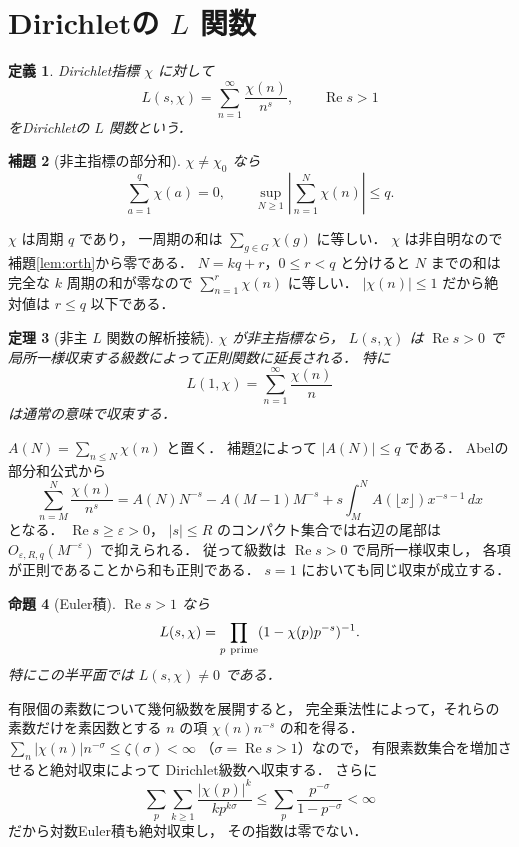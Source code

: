 \documentclass[a5paper,10pt,onecolumn]{jsarticle}
\makeatletter
\theoremstyle{mathnotetheorem}
\newtheorem{theorem}{定理}[section]
\newtheorem{definition}[theorem]{定義}
\newtheorem{lemma}[theorem]{補題}
\newtheorem{proposition}[theorem]{命題}
\renewcommand{\proofname}{証明}
\renewenvironment{proof}[1][\proofname]{%
  \par\pushQED{\qed}\normalfont\topsep4\p@\@plus2\p@\relax
  \trivlist\item[\hskip\labelsep\bfseries #1]\ignorespaces
}{\popQED\endtrivlist\@endpefalse}
\makeatother
\begin{document}
\section{Dirichletの $L$ 関数}

\begin{definition}
Dirichlet指標 $\chi$ に対して
\[
 L(s,\chi)=\sum_{n=1}^\infty\frac{\chi(n)}{n^s},
 \qquad \operatorname{Re}s>1
\]
をDirichletの $L$ 関数という．
\end{definition}

\begin{lemma}[非主指標の部分和]\label{lem:partialsums}
$\chi\ne\chi_0$ なら
\[
 \sum_{a=1}^q\chi(a)=0,\qquad
 \sup_{N\ge1}\left|\sum_{n=1}^N\chi(n)\right|\le q.
\]
\end{lemma}
\begin{proof}
$\chi$ は周期 $q$ であり，
一周期の和は
$\sum_{g\in G}\chi(g)$ に等しい．
$\chi$ は非自明なので補題\ref{lem:orth}から零である．
$N=kq+r$，$0\le r<q$ と分けると
$N$ までの和は完全な $k$ 周期の和が零なので
$\sum_{n=1}^r\chi(n)$ に等しい．
$|\chi(n)|\le1$ だから絶対値は $r\le q$ 以下である．
\end{proof}

\begin{theorem}[非主 $L$ 関数の解析接続]\label{thm:L-hol}
$\chi$ が非主指標なら，
$L(s,\chi)$ は $\operatorname{Re}s>0$ で
局所一様収束する級数によって正則関数に延長される．
特に
\[
 L(1,\chi)=\sum_{n=1}^\infty\frac{\chi(n)}n
\]
は通常の意味で収束する．
\end{theorem}
\begin{proof}
$A(N)=\sum_{n\le N}\chi(n)$ と置く．
補題\ref{lem:partialsums}によって $|A(N)|\le q$ である．
Abelの部分和公式から
\[
 \sum_{n=M}^{N}\frac{\chi(n)}{n^s}
 =A(N)N^{-s}-A(M-1)M^{-s}
  +s\int_M^N A(\lfloor x\rfloor)x^{-s-1}\,dx
\]
となる．
$\operatorname{Re}s\ge\varepsilon>0$，
$|s|\le R$ のコンパクト集合では右辺の尾部は
$O_{\varepsilon,R,q}(M^{-\varepsilon})$ で抑えられる．
従って級数は $\operatorname{Re}s>0$ で局所一様収束し，
各項が正則であることから和も正則である．
$s=1$ においても同じ収束が成立する．
\end{proof}

\begin{proposition}[Euler積]\label{prop:euler}
$\operatorname{Re}s>1$ なら
\[
 L(s,\chi)=\prod_{p\ {\rm prime}}
 (1-\chi(p)p^{-s})^{-1}.
\]
特にこの半平面では $L(s,\chi)\ne0$ である．
\end{proposition}
\begin{proof}
有限個の素数について幾何級数を展開すると，
完全乗法性によって，それらの素数だけを素因数とする
$n$ の項 $\chi(n)n^{-s}$ の和を得る．
$\sum_n|\chi(n)|n^{-\sigma}\le\zeta(\sigma)<\infty$
（$\sigma=\operatorname{Re}s>1$）なので，
有限素数集合を増加させると絶対収束によって
Dirichlet級数へ収束する．
さらに
\[
 \sum_p\sum_{k\ge1}
 \frac{|\chi(p)|^k}{k p^{k\sigma}}
 \le\sum_p\frac{p^{-\sigma}}{1-p^{-\sigma}}<\infty
\]
だから対数Euler積も絶対収束し，
その指数は零でない．
\end{proof}
\end{document}
